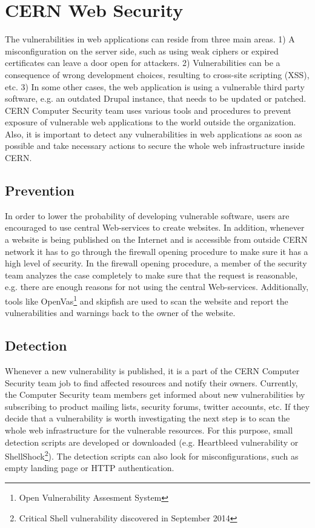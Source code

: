 \section{CERN Web Security}
The vulnerabilities in web applications can reside from three main areas. 1) A misconfiguration on the server side, such as using weak ciphers or expired certificates can leave a door open for attackers. 2) Vulnerabilities can be a consequence of wrong development choices, resulting to cross-site scripting (XSS), etc. 3) In some other cases, the web application is using a vulnerable third party software, e.g. an outdated Drupal instance, that needs to be updated or patched. CERN Computer Security team uses various tools and procedures to prevent exposure of vulnerable web applications to the world outside the organization. Also, it is important to detect any vulnerabilities in web applications as soon as possible and take necessary actions to secure the whole web infrastructure inside CERN.

\subsection{Prevention}
In order to lower the probability of developing vulnerable software, users are encouraged to use central Web-services to create websites. In addition, whenever a website is being published on the Internet and is accessible from outside CERN network it has to go through the firewall opening procedure to make sure it has a high level of security. In the firewall opening procedure, a member of the security team analyzes the case completely to make sure that the request is reasonable, e.g. there are enough reasons for not using the central Web-services. Additionally, tools like OpenVas\footnote{Open Vulnerability Assesment System} and skipfish are used to scan the website and report the vulnerabilities and warnings back to the owner of the website. 

\subsection{Detection}
Whenever a new vulnerability is published, it is a part of the CERN Computer Security team job to find affected resources and notify their owners. Currently, the Computer Security team members get informed about new vulnerabilities by subscribing to product mailing lists, security forums, twitter accounts, etc. If they decide that a vulnerability is worth investigating the next step is to scan the whole web infrastructure for the vulnerable resources. For this purpose, small detection scripts are developed or downloaded (e.g. Heartbleed vulnerability or ShellShock\footnote{Critical Shell vulnerability discovered in September 2014}). The detection scripts can also look for misconfigurations, such as empty landing page or HTTP authentication. 


